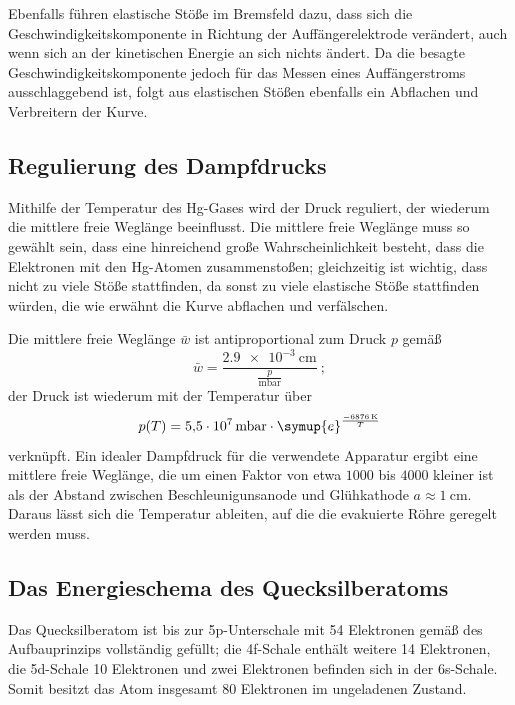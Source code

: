 Ebenfalls führen elastische Stöße im Bremsfeld dazu, dass sich die Geschwindigkeitskomponente in Richtung der Auffängerelektrode
verändert, auch wenn sich an der kinetischen Energie an sich nichts ändert. 
Da die besagte Geschwindigkeitskomponente jedoch für das Messen eines Auffängerstroms ausschlaggebend ist, folgt aus elastischen
Stößen ebenfalls ein Abflachen und Verbreitern der Kurve\cite{Versuchsanleitung}. 

\subsection{Regulierung des Dampfdrucks}
\label{sub:Druck}

Mithilfe der Temperatur des Hg-Gases wird der Druck reguliert, der wiederum die mittlere freie Weglänge beeinflusst. 
Die mittlere freie Weglänge muss so gewählt sein, dass eine hinreichend große Wahrscheinlichkeit besteht, dass die Elektronen 
mit den Hg-Atomen zusammenstoßen; gleichzeitig ist wichtig, dass nicht zu viele Stöße stattfinden, da sonst  
zu viele elastische Stöße stattfinden würden, die wie erwähnt die Kurve abflachen und verfälschen. 

Die mittlere freie Weglänge $\bar{w}$ ist antiproportional zum Druck $p$ gemäß 
\begin{equation}
    \bar{w}=\frac{\SI{2.9e-3}{\centi\meter}}{\frac{p}{\si{\milli\bar}}}\:;
    \label{eqn:Weglänge}
\end{equation}
der Druck ist wiederum mit der Temperatur über 
\begin{equation*}
    p(T)=\SI{5.5e7}{\milli\bar}\cdot \symup{e}^{\frac{\SI{-6876}{\kelvin}}{T}}
\end{equation*}
verknüpft. 
Ein idealer Dampfdruck für die verwendete Apparatur ergibt eine mittlere freie Weglänge, die um einen Faktor von etwa 
$1000$ bis $4000$ kleiner ist als der Abstand zwischen Beschleunigunsanode und Glühkathode $a\approx \SI{1}{\centi\meter}$. 
Daraus lässt sich die Temperatur ableiten, auf die die evakuierte Röhre geregelt werden muss\cite{Versuchsanleitung}. 

\subsection{Das Energieschema des Quecksilberatoms}

Das Quecksilberatom ist bis zur 5p-Unterschale mit 54 Elektronen gemäß des Aufbauprinzips vollständig gefüllt; 
die 4f-Schale enthält weitere 14 Elektronen, die 5d-Schale 10 Elektronen und zwei Elektronen befinden sich in der 6s-Schale. 
Somit besitzt das Atom insgesamt 80 Elektronen im ungeladenen Zustand. 

